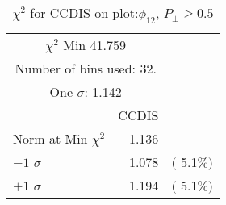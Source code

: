  \begin{table}[h!]\centering
 {\small{
 \begin{tabular}{||l||r||r||}
 \hline
 \hline
\multicolumn{2}{||c||}{$\chi^{2}$ Min  41.759} & \\
 \multicolumn{2}{||c||}{Number of bins used:   32.} & \\
\multicolumn{2}{||c||}{One $\sigma$:    1.142} & \\
 \hline
 \hline
    & CCDIS & \\
Norm at Min $\chi^{2}$  &   1.136 & \\
$-1$ $\sigma$ &   1.078  &  $($  5.1$\%)$  \\
$+1$ $\sigma$ &   1.194  &  $($  5.1$\%)$  \\
 \hline
 \hline
 \end{tabular}
 \caption{$\chi^{2}$ for CCDIS on plot:$\phi_{12}$, $P_\pm \geq 0.5$}
 \label{tab-chicc}
 }}
 \end{table}
 \endinput
